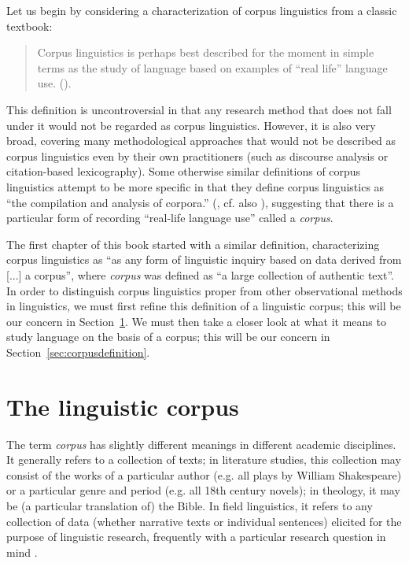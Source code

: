 Let us begin by considering a characterization of corpus linguistics from a classic textbook:

\begin{quotation}
Corpus linguistics is perhaps best described for the moment in simple terms as the study of language based on examples of ``real life'' language use. (\citealt[1]{mcenery_corpus_2001}).
\end{quotation}

This definition is uncontroversial in that any research method that does not fall under it would not be regarded as corpus linguistics. However, it is also very broad, covering many methodological approaches that would not be described as corpus linguistics even by their own practitioners (such as discourse analysis or citation\hyp{}based lexicography). Some otherwise similar definitions of corpus linguistics attempt to be more specific in that they define corpus linguistics as ``the compilation and analysis of corpora.'' (\citealt[6]{cheng_exploring_2012}, cf. also \citealt[xi]{meyer_english_2002}), suggesting that there is a particular form of recording ``real\hyp{}life language use'' called a \emph{corpus}.

The first chapter of this book started with a similar definition, characterizing corpus linguistics as ``as any form of linguistic inquiry based on data derived from [...] a corpus'', where \emph{corpus} was defined as ``a large  collection of authentic  text''. In order to distinguish corpus linguistics proper from other observational  methods in linguistics, we must first refine this definition of a linguistic corpus; this will be our concern in Section~\ref{sec:linguisticcorpus}. We must then take a closer look at what it means to study language on the basis of a corpus; this will be our concern in Section~\ref{sec:corpusdefinition}.

\section{The linguistic corpus}
\label{sec:linguisticcorpus}

The term \emph{corpus} has slightly different meanings  in different academic disciplines. It generally refers to a collection of texts; in literature  studies, this collection may consist of the works of a particular author (e.g. all plays by William Shakespeare) or a particular genre  and period (e.g. all 18th century novels); in theology, it may be (a particular translation of) the Bible. In field linguistics, it refers to any collection of data (whether narrative texts or individual sentences) elicited  for the purpose of linguistic research, frequently with a particular research question in mind \citep[cf.][769]{sebba_corpora_1994}.

